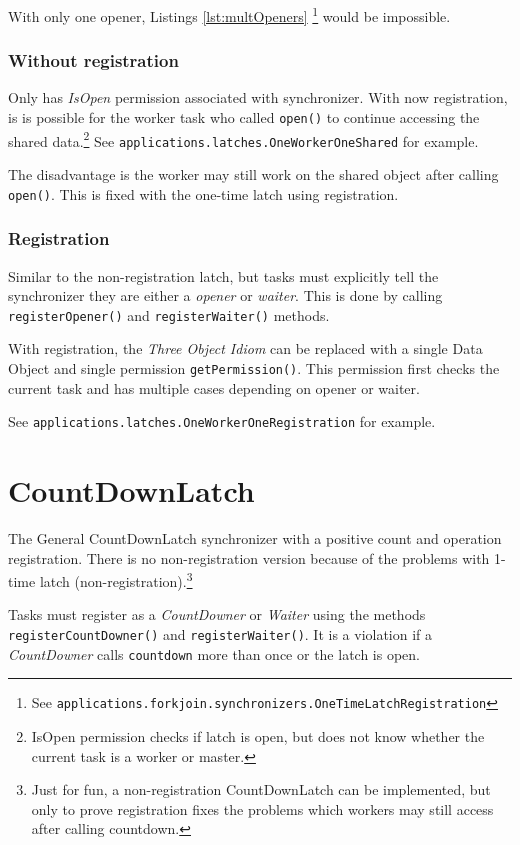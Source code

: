 \documentclass[11pt]{article}
\begin{document}
    With only one opener, Listings \ref{lst:multOpeners}
    \footnote{See \lstinline{applications.forkjoin.synchronizers.OneTimeLatchRegistration}}
    would be impossible.

    \subsubsection{Without registration}
    Only has \textit{IsOpen} permission associated with synchronizer. With now registration, is is possible
    for the worker task who called \lstinline{open()} to continue accessing the shared data.\footnote{IsOpen
    permission checks if latch is open, but does not know whether the current task is a worker or master.}
    See \lstinline{applications.latches.OneWorkerOneShared} for example.

    The disadvantage is the worker may still work on the shared object after calling \lstinline{open()}. This is
    fixed with the one-time latch using registration.

    \subsubsection{Registration}
    Similar to the non-registration latch, but tasks must explicitly tell the synchronizer they are either a
    \textit{opener} or \textit{waiter}. This is done by calling \lstinline{registerOpener()} and
    \lstinline{registerWaiter()} methods.

    With registration, the \textit{Three Object Idiom} can be replaced with a single Data Object and single
    permission \lstinline{getPermission()}. This permission first checks the current task and has multiple
    cases depending on opener or waiter.

    See \lstinline{applications.latches.OneWorkerOneRegistration} for example.

    \section{CountDownLatch}
    The General CountDownLatch synchronizer with a positive count and operation registration. There is no
    non-registration version because of the problems with 1-time latch (non-registration).\footnote{
    Just for fun, a non-registration CountDownLatch can be implemented, but only to prove registration fixes
    the problems which workers may still access after calling countdown.
    }

    Tasks must register as a \textit{CountDowner} or \textit{Waiter} using the methods \lstinline{registerCountDowner()}
    and \lstinline{registerWaiter()}. It is a violation if a \textit{CountDowner} calls \lstinline{countdown} more than
    once or the latch is open.
\end{document}
